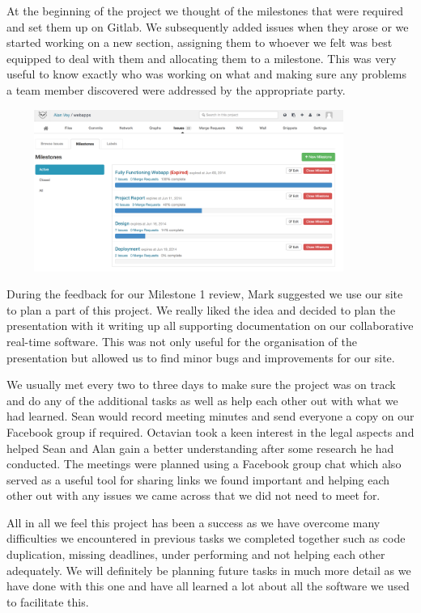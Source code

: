 \documentclass[a4wide, 11pt]{article}
\begin{document}
At the beginning of the project we thought of the milestones that were required and set them up on Gitlab. We subsequently added issues when they arose or we started working on a new section, assigning them to whoever we felt was best equipped to deal with them and allocating them to a milestone. This was very useful to know exactly who was working on what and making sure any problems a team member discovered were addressed by the appropriate party.


\includegraphics[width=450, height=200]{gitlab-milestones.png}
\clearpage

During the feedback for our Milestone 1 review, Mark suggested we use our site to plan a part of this project. We really liked the idea and decided to plan the presentation with it writing up all supporting documentation on our collaborative real-time software. This was not only useful for the organisation of the presentation but allowed us to find minor bugs and improvements for our site. 

We usually met every two to three days to make sure the project was on track and do any of the additional tasks as well as help each other out with what we had learned. Sean would record meeting minutes and send everyone a copy on our Facebook group if required. Octavian took a keen interest in the legal aspects and helped Sean and Alan gain a better understanding after some research he had conducted. The meetings were planned using a Facebook group chat which also served as a useful tool for sharing links we found important and helping each other out with any issues we came across that we did not need to meet for.

All in all we feel this project has been a success as we have overcome many difficulties we encountered in previous tasks we completed together such as code duplication, missing deadlines, under performing and not helping each other adequately. We will definitely be planning future tasks in much more detail as we have done with this one and have all learned a lot about all the software we used to facilitate this.
\clearpage
\end{document}
